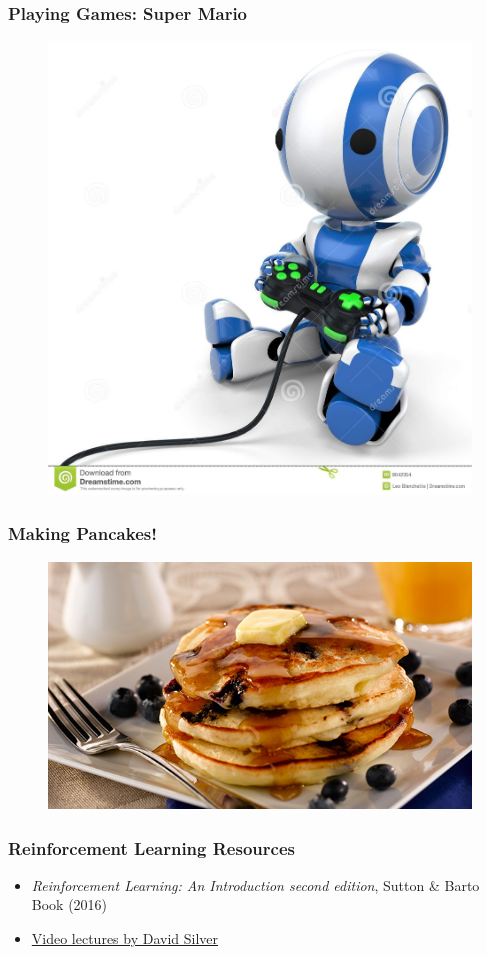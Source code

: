 \documentclass[handout]{beamer}
\begin{document}
\begin{frame}\frametitle{Playing Games: Super Mario}\small
\begin{figure}
\href{run:videos/intro/super_mario.mp4}{
\includegraphics[width =0.6\linewidth,trim=0 69 0 0,clip]{Figures/robot_game.jpg}\\
{}
}
\end{figure}
\end{frame}

\begin{frame}\frametitle{Making Pancakes!}\small
\begin{figure}
\href{run:videos/lecture19/pancakes.mp4}{
\includegraphics[width=0.9\linewidth]{Figures/pancakes1}\\
{}
}
\end{figure}
\end{frame}


\begin{frame}\frametitle{Reinforcement Learning Resources}\small
\begin{itemize}

\item {\it Reinforcement Learning: An Introduction second edition}, Sutton \& Barto Book (2016)
\item  \href{https://www.youtube.com/watch?v=2pWv7GOvuf0}{Video lectures by David Silver}
\end{itemize}
\end{frame}
\end{document}
